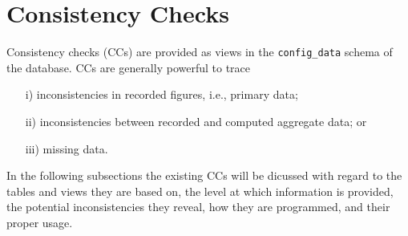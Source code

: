 \documentclass[%
parskip=half-,%
fontsize=12pt,%
DIV=13,%
oneside,%
english,%
abstract=off,%
toc=chapterentrywithdots,toc=bibnumbered]{scrreprt}
\begin{document}










\newpage
\section{Consistency Checks}\label{Section_ConsistencyChecks}

Consistency checks (CCs) are provided as views in the \texttt{\footnotesize config\_data} schema of the database.
CCs are generally powerful to trace  
\begin{itemize}
\item[i)]inconsistencies in recorded figures, i.e., primary data;
\item[ii)]inconsistencies between recorded and computed aggregate data;
or 
\item[iii)] missing data.
\end{itemize}

In the following subsections the existing CCs will be dicussed with regard to the tables and views they are based on, the level at which information is provided, the potential inconsistencies they reveal, how they are programmed, and their proper usage.




















\end{document}
